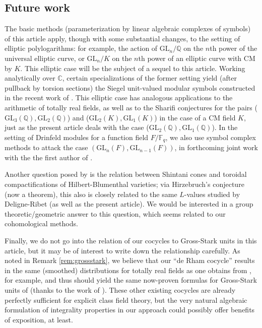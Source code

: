 \documentclass[10pt]{amsart}
\theoremstyle{definition}
\newcommand{\Q}{\mathbb{Q}}
\newcommand{\F}{\mathbb{F}}
\newcommand{\GL}{\mathrm{GL}}
\numberwithin{equation}{section}
\begin{document}
    \subsection{Future work}

    The basic methods (parameterization by linear algebraic complexes of symbols) of this article apply, though with some substantial changes, to the setting of elliptic polylogarithms: for example, the action of $\mathrm{GL}_n/\mathbb{Q}$ on the $n$th power of the universal elliptic curve, or $\mathrm{GL}_n/K$ on the $n$th power of an elliptic curve with CM by $K$. This elliptic case will be the subject of a sequel to this article. Working analytically over $\mathbb{C}$, certain specializations of the former setting yield (after pullback by torsion sections) the Siegel unit-valued modular symbols constructed in the recent work of \cite{BPPS}. This elliptic case has analogous applications to the arithmetic of totally real fields, as well as to the Sharifi conjectures for the pairs ($\GL_3(\Q),\GL_2(\Q)$) and ($\GL_2(K),\GL_1(K)$) in the case of a CM field $K$, just as the present article deals with the case ($\GL_2(\Q),\GL_1(\Q)$). In the setting of Drinfeld modules for a function field $F/\F_q$, we also use symbol complex methods to attack the case $(\GL_n(F), \GL_{n-1}(F))$, in forthcoming joint work with the the first author of \cite{SV}.

    Another question posed by \cite{Katz} is the relation between Shintani cones and toroidal compactifications of Hilbert-Blumenthal varieties; via Hirzebruch's conjecture (now a theorem), this also is closely related to the same $L$-values studied by Deligne-Ribet (as well as the present article). We would be interested in a group theoretic/geometric answer to this question, which seems related to our cohomological methods.

    Finally, we do not go into the relation of our cocycles to Gross-Stark units in this article, but it may be of interest to write down the relationship carefully. As noted in Remark \ref{rem:grossstark}, we believe that our ``de Rham cocycle'' results in the same (smoothed) distributions for totally real fields as one obtains from \cite{CDG}, for example, and thus should yield the same now-proven formulas for Gross-Stark units of \cite{DS} (thanks to the work of \cite{DKSW}). These other existing cocycles are already perfectly sufficient for explicit class field theory, but the very natural algebraic formulation of integrality properties in our approach could possibly offer benefits of exposition, at least. 
    
\end{document}

